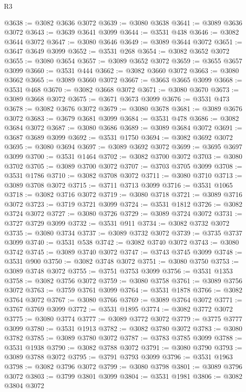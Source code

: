 \begin{lexlean}{R3}
\begin{coremodule}
@3638 := @3082 @3636 @3072
@3639 := @3080 @3638
@3641 := @3089 @3636 @3072
@3643 := @3639 @3641 @3099
@3644 := @3531 @438
@3646 := @3082 @3644 @3072
@3647 := @3080 @3646
@3649 := @3089 @3644 @3072
@3651 := @3647 @3649 @3099
@3652 := @3531 @268
@3654 := @3082 @3652 @3072
@3655 := @3080 @3654
@3657 := @3089 @3652 @3072
@3659 := @3655 @3657 @3099
@3660 := @3531 @444
@3662 := @3082 @3660 @3072
@3663 := @3080 @3662
@3665 := @3089 @3660 @3072
@3667 := @3663 @3665 @3099
@3668 := @3531 @468
@3670 := @3082 @3668 @3072
@3671 := @3080 @3670
@3673 := @3089 @3668 @3072
@3675 := @3671 @3673 @3099
@3676 := @3531 @473
@3678 := @3082 @3676 @3072
@3679 := @3080 @3678
@3681 := @3089 @3676 @3072
@3683 := @3679 @3681 @3099
@3684 := @3531 @478
@3686 := @3082 @3684 @3072
@3687 := @3080 @3686
@3689 := @3089 @3684 @3072
@3691 := @3687 @3689 @3099
@3692 := @3531 @1750
@3694 := @3082 @3692 @3072
@3695 := @3080 @3694
@3697 := @3089 @3692 @3072
@3699 := @3695 @3697 @3099
@3700 := @3531 @1464
@3702 := @3082 @3700 @3072
@3703 := @3080 @3702
@3705 := @3089 @3700 @3072
@3707 := @3703 @3705 @3099
@3708 := @3531 @1786
@3710 := @3082 @3708 @3072
@3711 := @3080 @3710
@3713 := @3089 @3708 @3072
@3715 := @3711 @3713 @3099
@3716 := @3531 @1065
@3718 := @3082 @3716 @3072
@3719 := @3080 @3718
@3721 := @3089 @3716 @3072
@3723 := @3719 @3721 @3099
@3724 := @3531 @1812
@3726 := @3082 @3724 @3072
@3727 := @3080 @3726
@3729 := @3089 @3724 @3072
@3731 := @3727 @3729 @3099
@3732 := @3531 @911
@3734 := @3082 @3732 @3072
@3735 := @3080 @3734
@3737 := @3089 @3732 @3072
@3739 := @3735 @3737 @3099
@3740 := @3531 @538
@3742 := @3082 @3740 @3072
@3743 := @3080 @3742
@3745 := @3089 @3740 @3072
@3747 := @3743 @3745 @3099
@3748 := @3531 @900
@3750 := @3082 @3748 @3072
@3751 := @3080 @3750
@3753 := @3089 @3748 @3072
@3755 := @3751 @3753 @3099
@3756 := @3531 @1353
@3758 := @3082 @3756 @3072
@3759 := @3080 @3758
@3761 := @3089 @3756 @3072
@3763 := @3759 @3761 @3099
@3764 := @3531 @1878
@3766 := @3082 @3764 @3072
@3767 := @3080 @3766
@3769 := @3089 @3764 @3072
@3771 := @3767 @3769 @3099
@3772 := @3531 @1895
@3774 := @3082 @3772 @3072
@3775 := @3080 @3774
@3777 := @3089 @3772 @3072
@3779 := @3775 @3777 @3099
@3780 := @3531 @1913
@3782 := @3082 @3780 @3072
@3783 := @3080 @3782
@3785 := @3089 @3780 @3072
@3787 := @3783 @3785 @3099
@3788 := @3531 @1938
@3790 := @3082 @3788 @3072
@3791 := @3080 @3790
@3793 := @3089 @3788 @3072
@3795 := @3791 @3793 @3099
@3796 := @3531 @1963
@3798 := @3082 @3796 @3072
@3799 := @3080 @3798
@3801 := @3089 @3796 @3072
@3803 := @3799 @3801 @3099
@3804 := @3531 @1981
@3806 := @3082 @3804 @3072

\end{coremodule}
\end{lexlean}
